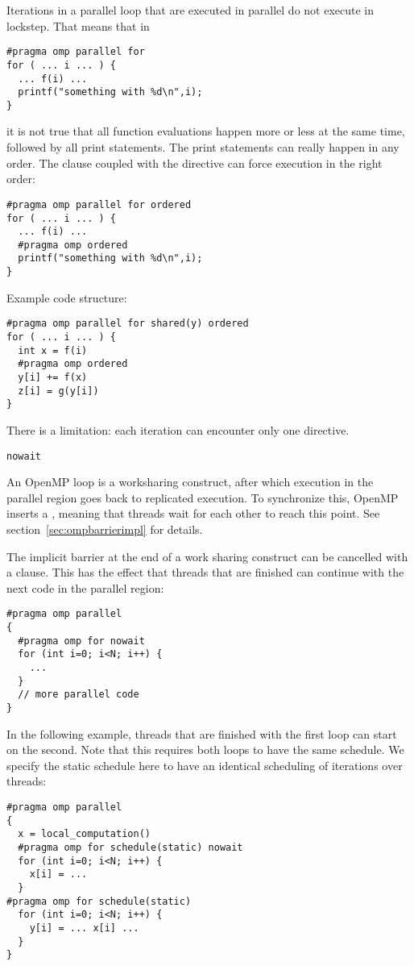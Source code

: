 Iterations in a parallel loop that are executed in parallel do not
execute in lockstep. That means that in
\begin{lstlisting}[language=omp]
#pragma omp parallel for
for ( ... i ... ) {
  ... f(i) ...
  printf("something with %d\n",i);
}
\end{lstlisting}
it is not true that all function evaluations happen more or less at
the same time, followed by all print statements. The print statements
can really happen in any order. The  clause
coupled with the  directive can
force execution in the right order:
\begin{lstlisting}[language=omp]
#pragma omp parallel for ordered
for ( ... i ... ) {
  ... f(i) ...
  #pragma omp ordered
  printf("something with %d\n",i);
}
\end{lstlisting}
Example code structure:
\begin{lstlisting}[language=omp]
#pragma omp parallel for shared(y) ordered
for ( ... i ... ) {
  int x = f(i)
  #pragma omp ordered
  y[i] += f(x)
  z[i] = g(y[i])
}
\end{lstlisting}
There is a limitation:
each iteration can encounter only one  directive.

 {\texttt{nowait}}
\label{sec:omp-nowait}

An OpenMP loop is a worksharing construct,
after which execution in the parallel region goes back
to replicated execution.
To synchronize this, OpenMP inserts a ,
meaning that threads wait for each other to reach this point.
See section~\ref{sec:ompbarrierimpl} for details.

The implicit barrier at the end of a work sharing construct
can be cancelled with a
 clause.
This has the effect that threads that are finished can continue
with the next code in the parallel region:
\begin{lstlisting}[language=omp]
#pragma omp parallel
{
  #pragma omp for nowait
  for (int i=0; i<N; i++) {
    ...
  }
  // more parallel code
}
\end{lstlisting}

In the following example, threads that are finished with the first loop
can start on the second. Note that this requires both loops to have
the same schedule. We specify the static schedule here to have an
identical scheduling of iterations over threads:
\begin{lstlisting}[language=omp]
#pragma omp parallel
{
  x = local_computation()
  #pragma omp for schedule(static) nowait
  for (int i=0; i<N; i++) { 
    x[i] = ... 
  }
#pragma omp for schedule(static)
  for (int i=0; i<N; i++) { 
    y[i] = ... x[i] ...
  }
}
\end{lstlisting}


